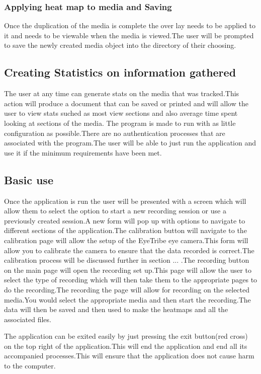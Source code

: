 \subsubsection{Applying heat map to media and Saving}
Once the duplication of the media is complete the over lay needs to be applied to it and needs to be viewable when the media is viewed.The user will be prompted to save the newly created media object into the directory of their choosing.
\subsection{Creating Statistics on information gathered}
The user at any time can generate stats on the  media that was tracked.This action will produce a document that can be saved or printed and will allow the user to view stats suched as most view sections and also average time spent looking at sections of the media.
\fi
The program is made to run with as little configuration as possible.There are no authentication processes that are associated with the program.The user will be able to just run the application and use it if the minimum requirements have been met.

\subsection{Basic use}
Once the application is run the user will be presented with a screen which will allow them to select the option to start a new recording session or use a previously created session.A new form will pop up with options to navigate to different sections of the application.The calibration button will navigate to the calibration page will allow the setup of the EyeTribe eye camera.This form will allow you to calibrate the camera to ensure that the data recorded is correct.The calibration process will be discussed further in section ... .The recording button on the main page will open the recording set up.This page will allow the user to select the type of recording which will then take them to the appropriate pages to do the recording.The recording the page will allow for recording on the selected media.You would select the appropriate media and then start the recording.The data will then be saved and then used to make the heatmaps and all the associated files.\newline

The application can be exited easily by just pressing the exit button(red cross) on the top right of the application.This will end the application and end all its accompanied processes.This will ensure that the application does not cause harm to the computer.


